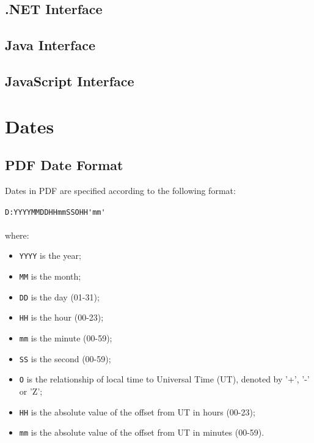 \documentclass{book}
\begin{document}
\begin{dotnetcpdflib}
\clearpage
\section*{.NET Interface}
\begin{small}\tt

\end{small}
\end{dotnetcpdflib}

\begin{jcpdflib}
\clearpage
\section*{Java Interface}
\begin{small}\tt

\end{small}
\end{jcpdflib}

\begin{jscpdflib}
\clearpage
\section*{JavaScript Interface}
\begin{small}\tt

\end{small}
\end{jscpdflib}

\appendix
\chapter{Dates}\pagestyle{empty}
\label{dates}

\section{PDF Date Format}
Dates in PDF are specified according to the following format:

\begin{framed}
\verb!D:YYYYMMDDHHmmSSOHH'mm'!\\\\where:

\begin{itemize}
  \item \texttt{YYYY} is the year;
  \item \texttt{MM} is the month;
  \item \texttt{DD} is the day (01-31);
  \item \texttt{HH} is the hour (00-23);
  \item \texttt{mm} is the minute (00-59);
  \item \texttt{SS} is the second (00-59);
  \item \texttt{O} is the relationship of local time to Universal Time (UT), denoted by '+', '-' or 'Z';
  \item \texttt{HH} is the absolute value of the offset from UT in hours (00-23);
  \item \texttt{mm} is the absolute value of the offset from UT in minutes (00-59).
\end{itemize}
\end{framed}
\end{document}
